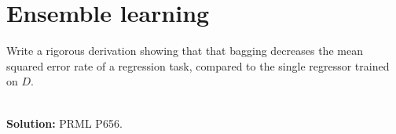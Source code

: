 
\section{Ensemble learning}

Write a rigorous derivation showing that that bagging decreases the mean squared error rate of a regression task, compared to the single regressor trained on $D$.

\ \\{\bf Solution:} PRML P656.